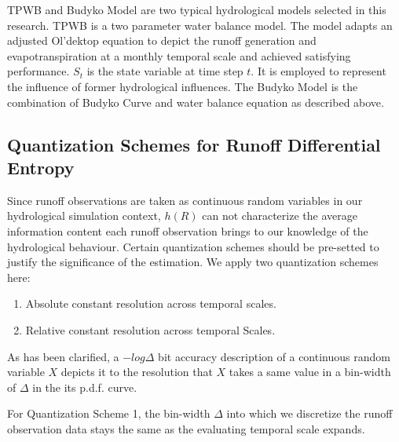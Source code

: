 \documentclass[11pt]{article}
\begin{document}
TPWB and Budyko Model are two typical hydrological models selected in this research. 
TPWB is a two parameter water balance model\cite{xiong1999two}. The model adapts an adjusted Ol'dektop equation\cite{jobson1982evaporation} to depict the runoff generation and evapotranspiration at a monthly temporal scale and achieved satisfying performance. $S_t$ is the state variable at time step $t$. It is employed to represent the influence of former hydrological influences. The Budyko Model is the combination of Budyko Curve and water balance equation as described above. %

\subsection{Quantization Schemes for Runoff Differential Entropy}

Since runoff observations are taken as continuous random variables in our hydrological simulation context, $h(R)$ can not characterize the average information content each runoff observation brings to our knowledge of the hydrological behaviour. Certain quantization schemes should be pre-setted to justify the significance of the estimation. We apply two quantization schemes here:
\begin{enumerate}
\item Absolute constant resolution across temporal scales.
\item Relative constant resolution across temporal Scales.
\end{enumerate} 

As has been clarified, a $-log\Delta$ bit accuracy description of a continuous random variable $X$ depicts it to the resolution that $X$ takes a same value in a bin-width of $\Delta$ in the its p.d.f. curve. 

For Quantization Scheme 1,  the bin-width $\Delta$ into which we discretize the runoff observation data stays the same as the evaluating temporal scale expands. 
\end{document}
